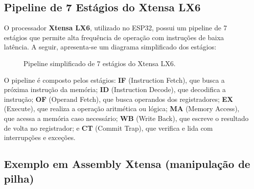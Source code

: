 \documentclass[12pt, letterpaper, twoside]{article}
\begin{document}
\subsection{Pipeline de 7 Estágios do Xtensa LX6}

O processador 	\textbf{Xtensa LX6}, utilizado no ESP32, possui um pipeline de 7 estágios que permite alta frequência de operação com instruções de baixa latência. A seguir, apresenta-se um diagrama simplificado dos estágios:

\begin{figure}
\centering
\caption{Pipeline simplificado de 7 estágios do Xtensa LX6.}
\end{figure}


O pipeline é composto pelos estágios: \textbf{IF} (Instruction Fetch), que busca a próxima instrução da memória; \textbf{ID} (Instruction Decode), que decodifica a instrução; \textbf{OF} (Operand Fetch), que busca operandos dos registradores; \textbf{EX} (Execute), que realiza a operação aritmética ou lógica; \textbf{MA} (Memory Access), que acessa a memória caso necessário; \textbf{WB} (Write Back), que escreve o resultado de volta no registrador; e \textbf{CT} (Commit Trap), que verifica e lida com interrupções e exceções.

\subsection{Exemplo em Assembly Xtensa (manipulação de pilha)}
\end{document}
